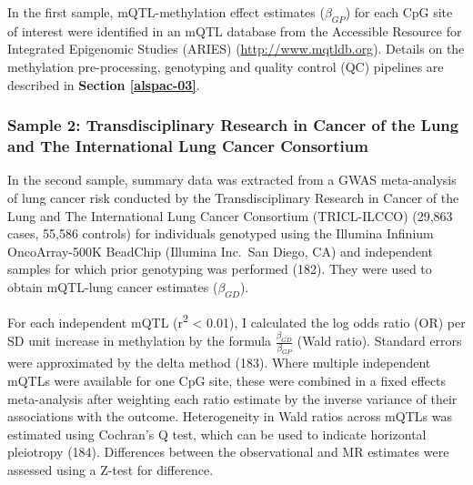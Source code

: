 \documentclass[11pt,oneside]{bristolthesis}
\begin{document}
In the first sample, mQTL-methylation effect estimates (\(\beta_{GP}\)) for each CpG site of interest were identified in an mQTL database from the Accessible Resource for Integrated Epigenomic Studies (ARIES) (\url{http://www.mqtldb.org}). Details on the methylation pre-processing, genotyping and quality control (QC) pipelines are described in \textbf{Section \ref{alspac-03}}.

\hypertarget{sample-2-transdisciplinary-research-in-cancer-of-the-lung-and-the-international-lung-cancer-consortium}{%
\subsubsection{Sample 2: Transdisciplinary Research in Cancer of the Lung and The International Lung Cancer Consortium}\label{sample-2-transdisciplinary-research-in-cancer-of-the-lung-and-the-international-lung-cancer-consortium}}

In the second sample, summary data was extracted from a GWAS meta-analysis of lung cancer risk conducted by the Transdisciplinary Research in Cancer of the Lung and The International Lung Cancer Consortium (TRICL-ILCCO) (29,863 cases, 55,586 controls) for individuals genotyped using the Illumina Infinium OncoArray-500K BeadChip (Illumina Inc.~San Diego, CA) and independent samples for which prior genotyping was performed (182). They were used to obtain mQTL-lung cancer estimates (\(\beta_{GD}\)).

For each independent mQTL (r\textsuperscript{2} \textless{} 0.01), I calculated the log odds ratio (OR) per SD unit increase in methylation by the formula \(\frac{\beta_{GD}} {\beta_{GP}}\) (Wald ratio). Standard errors were approximated by the delta method (183). Where multiple independent mQTLs were available for one CpG site, these were combined in a fixed effects meta-analysis after weighting each ratio estimate by the inverse variance of their associations with the outcome. Heterogeneity in Wald ratios across mQTLs was estimated using Cochran's Q test, which can be used to indicate horizontal pleiotropy (184). Differences between the observational and MR estimates were assessed using a Z-test for difference.
\end{document}
